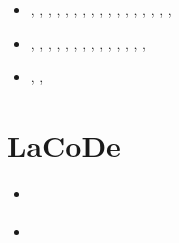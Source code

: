 \begin{small}
\begin{itemize}
\item[\twothousandtwentythree] \textcite{wulq23},  \textcite{zhli23}, \textcite{palb23},
                               \textcite{ankm23},  \textcite{pezg23}, \textcite{izhy23},
                               \textcite{bogj23},  \textcite{lige23}, \textcite{stgc23},
                               \textcite{chzl23},  \textcite{walh23}, \textcite{yams23},
                               \textcite{xumm23},  \textcite{guyg23}, \textcite{sayb23},
                               \textcite{fava23},  \textcite{xicy23}, \textcite{kekg23}
\item[\twothousandtwentyfour]  \textcite{xicc24},  \textcite{fuli24}, \textcite{chzy24},
                               \textcite{sihf24},  \textcite{qicz24}, \textcite{qilb24},
                               \textcite{orbg24},  \textcite{ficd24}, \textcite{magp24},
                               \textcite{xibg24},  \textcite{xicm24}, \textcite{yacz24},
                               \textcite{makb24},  \textcite{culi24}, \textcite{zhhz24}
\item[\twothousandtwentyfive]  \textcite{masg25},  \textcite{pezg25}, \textcite{ligr25}
\end{itemize}
\end{small}





\section{LaCoDe} 

\begin{small}
\begin{itemize}
\item[\twothousandnineteen] \textcite{demh19}
\item[\twothousandtwentytwo] \textcite{vacd22}
\end{itemize}
\end{small}



